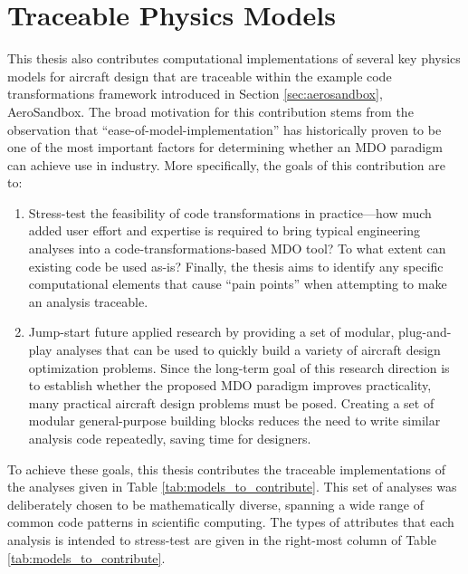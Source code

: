 \chapter{Traceable Physics Models}
\label{chap:physics}

This thesis also contributes computational implementations of several key physics models for aircraft design that are traceable within the example code transformations framework introduced in Section \ref{sec:aerosandbox}, AeroSandbox. The broad motivation for this contribution stems from the observation that ``ease-of-model-implementation'' has historically proven to be one of the most important factors for determining whether an MDO paradigm can achieve use in industry. More specifically, the goals of this contribution are to:

\begin{enumerate}
    \item Stress-test the feasibility of code transformations in practice—how much added user effort and expertise is required to bring typical engineering analyses into a code-transformations-based MDO tool? To what extent can existing code be used as-is? Finally, the thesis aims to identify any specific computational elements that cause ``pain points'' when attempting to make an analysis traceable.
    \item Jump-start future applied research by providing a set of modular, plug-and-play analyses that can be used to quickly build a variety of aircraft design optimization problems. Since the long-term goal of this research direction is to establish whether the proposed MDO paradigm improves practicality, many practical aircraft design problems must be posed. Creating a set of modular general-purpose building blocks reduces the need to write similar analysis code repeatedly, saving time for designers.
\end{enumerate}

To achieve these goals, this thesis contributes the traceable implementations of the analyses given in Table \ref{tab:models_to_contribute}. This set of analyses was deliberately chosen to be mathematically diverse, spanning a wide range of common code patterns in scientific computing. The types of attributes that each analysis is intended to stress-test are given in the right-most column of Table \ref{tab:models_to_contribute}.

